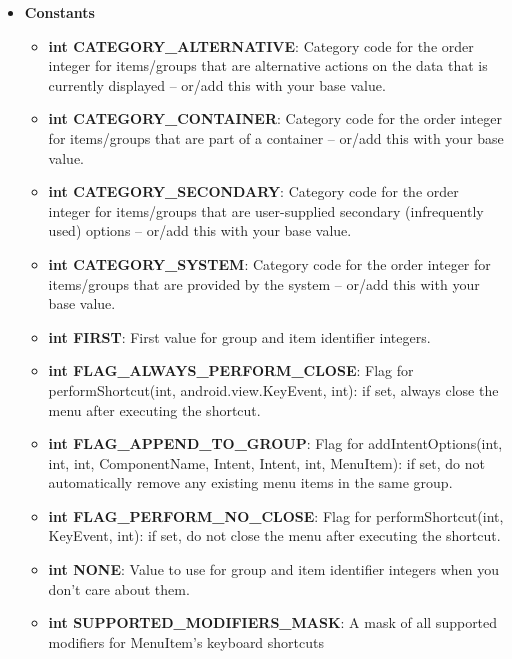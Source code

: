 \documentclass{report}
\begin{document}
\begin{itemize}
\begin{itemize}
            \end{itemize}
        \item \textbf{Constants}
            \begin{itemize}
                \item \textbf{int	CATEGORY\_ALTERNATIVE}: Category code for the order integer for items/groups that are alternative actions on the data that is currently displayed -- or/add this with your base value.
                \item \textbf{int	CATEGORY\_CONTAINER}: Category code for the order integer for items/groups that are part of a container -- or/add this with your base value.
                \item \textbf{int	CATEGORY\_SECONDARY}: Category code for the order integer for items/groups that are user-supplied secondary (infrequently used) options -- or/add this with your base value.
                \item \textbf{int	CATEGORY\_SYSTEM}: Category code for the order integer for items/groups that are provided by the system -- or/add this with your base value.
                \item \textbf{int	FIRST}: First value for group and item identifier integers.
                \item \textbf{int	FLAG\_ALWAYS\_PERFORM\_CLOSE}: Flag for performShortcut(int, android.view.KeyEvent, int): if set, always close the menu after executing the shortcut.
                \item \textbf{int	FLAG\_APPEND\_TO\_GROUP}: Flag for addIntentOptions(int, int, int, ComponentName, Intent, Intent, int, MenuItem): if set, do not automatically remove any existing menu items in the same group.
                \item \textbf{int	FLAG\_PERFORM\_NO\_CLOSE}: Flag for performShortcut(int, KeyEvent, int): if set, do not close the menu after executing the shortcut.
                \item \textbf{int	NONE}: Value to use for group and item identifier integers when you don't care about them.
                \item \textbf{int	SUPPORTED\_MODIFIERS\_MASK}: A mask of all supported modifiers for MenuItem's keyboard shortcuts
    \end{itemize}

    \pagebreak 

\end{itemize}
\end{document}

